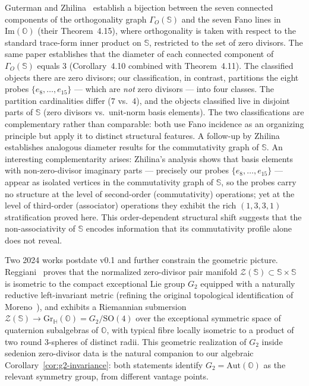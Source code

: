 \documentclass[12pt,a4paper]{article}
\begin{document}
Guterman and Zhilina~\cite{guterman_zhilina2021} establish a bijection between the seven connected components of the orthogonality graph $\Gamma_O(\mathbb{S})$ and the seven Fano lines in $\mathrm{Im}(\mathbb{O})$ (their Theorem~4.15), where orthogonality is taken with respect to the standard trace-form inner product on $\mathbb{S}$, restricted to the set of zero divisors. The same paper establishes that the diameter of each connected component of $\Gamma_O(\mathbb{S})$ equals 3 (Corollary~4.10 combined with Theorem~4.11). The classified objects there are zero divisors; our classification, in contrast, partitions the eight probes $\{e_8, \ldots, e_{15}\}$ --- which are \emph{not} zero divisors --- into four classes. The partition cardinalities differ ($7$ vs.\ $4$), and the objects classified live in disjoint parts of $\mathbb{S}$ (zero divisors vs.\ unit-norm basis elements). The two classifications are complementary rather than comparable: both use Fano incidence as an organizing principle but apply it to distinct structural features. A follow-up by Zhilina~\cite{zhilina2024} establishes analogous diameter results for the commutativity graph of $\mathbb{S}$.
An interesting complementarity arises: Zhilina's analysis shows that basis elements with non-zero-divisor imaginary parts --- precisely our probes $\{e_8, \ldots, e_{15}\}$ --- appear as isolated vertices in the commutativity graph of $\mathbb{S}$, so the probes carry no structure at the level of second-order (commutativity) operations; yet at the level of third-order (associator) operations they exhibit the rich $(1, 3, 3, 1)$ stratification proved here. This order-dependent structural shift suggests that the non-associativity of $\mathbb{S}$ encodes information that its commutativity profile alone does not reveal.

Two 2024 works postdate v0.1 and further constrain the geometric picture. Reggiani~\cite{reggiani2024} proves that the normalized zero-divisor pair manifold $\mathcal{Z}(\mathbb{S}) \subset \mathbb{S} \times \mathbb{S}$ is isometric to the compact exceptional Lie group $G_2$ equipped with a naturally reductive left-invariant metric (refining the original topological identification of Moreno~\cite{moreno1998}), and exhibits a Riemannian submersion $\mathcal{Z}(\mathbb{S}) \to \mathrm{Gr}_{\mathbb{H}}(\mathbb{O}) = G_2/\mathrm{SO}(4)$ over the exceptional symmetric space of quaternion subalgebras of $\mathbb{O}$, with typical fibre locally isometric to a product of two round 3-spheres of distinct radii. This geometric realization of $G_2$ inside sedenion zero-divisor data is the natural companion to our algebraic Corollary~\ref{cor:g2-invariance}: both statements identify $G_2 = \mathrm{Aut}(\mathbb{O})$ as the relevant symmetry group, from different vantage points.
\end{document}

